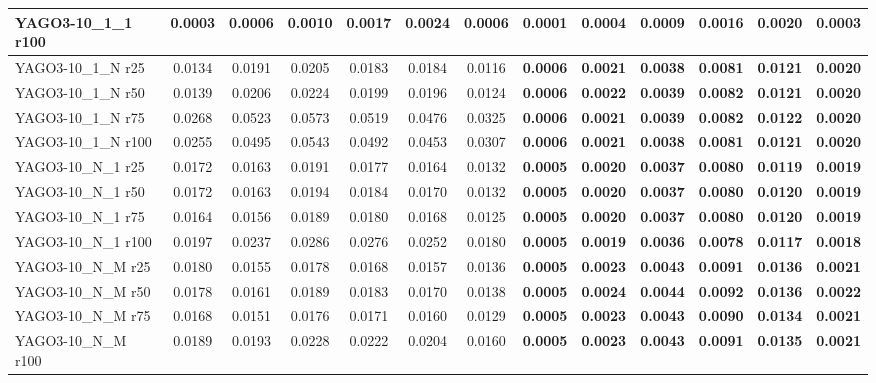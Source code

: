\begin{table}[t]
{\begin{tabular}{l||cccccc||cccccc}
YAGO3-10\_1\_1 r100 & 0.0003 & 0.0006 & 0.0010 & 0.0017 & 0.0024 & 0.0006 & \textbf{0.0001} & \textbf{0.0004} & \textbf{0.0009} & \textbf{0.0016} & \textbf{0.0020} & \textbf{0.0003} \\
\hline
YAGO3-10\_1\_N r25 & 0.0134 & 0.0191 & 0.0205 & 0.0183 & 0.0184 & 0.0116 & \textbf{0.0006} & \textbf{0.0021} & \textbf{0.0038} & \textbf{0.0081} & \textbf{0.0121} & \textbf{0.0020} \\
YAGO3-10\_1\_N r50 & 0.0139 & 0.0206 & 0.0224 & 0.0199 & 0.0196 & 0.0124 & \textbf{0.0006} & \textbf{0.0022} & \textbf{0.0039} & \textbf{0.0082} & \textbf{0.0121} & \textbf{0.0020} \\
YAGO3-10\_1\_N r75 & 0.0268 & 0.0523 & 0.0573 & 0.0519 & 0.0476 & 0.0325 & \textbf{0.0006} & \textbf{0.0021} & \textbf{0.0039} & \textbf{0.0082} & \textbf{0.0122} & \textbf{0.0020} \\
YAGO3-10\_1\_N r100 & 0.0255 & 0.0495 & 0.0543 & 0.0492 & 0.0453 & 0.0307 & \textbf{0.0006} & \textbf{0.0021} & \textbf{0.0038} & \textbf{0.0081} & \textbf{0.0121} & \textbf{0.0020} \\
\hline
YAGO3-10\_N\_1 r25 & 0.0172 & 0.0163 & 0.0191 & 0.0177 & 0.0164 & 0.0132 & \textbf{0.0005} & \textbf{0.0020} & \textbf{0.0037} & \textbf{0.0080} & \textbf{0.0119} & \textbf{0.0019} \\
YAGO3-10\_N\_1 r50 & 0.0172 & 0.0163 & 0.0194 & 0.0184 & 0.0170 & 0.0132 & \textbf{0.0005} & \textbf{0.0020} & \textbf{0.0037} & \textbf{0.0080} & \textbf{0.0120} & \textbf{0.0019} \\
YAGO3-10\_N\_1 r75 & 0.0164 & 0.0156 & 0.0189 & 0.0180 & 0.0168 & 0.0125 & \textbf{0.0005} & \textbf{0.0020} & \textbf{0.0037} & \textbf{0.0080} & \textbf{0.0120} & \textbf{0.0019} \\
YAGO3-10\_N\_1 r100 & 0.0197 & 0.0237 & 0.0286 & 0.0276 & 0.0252 & 0.0180 & \textbf{0.0005} & \textbf{0.0019} & \textbf{0.0036} & \textbf{0.0078} & \textbf{0.0117} & \textbf{0.0018} \\
\hline
YAGO3-10\_N\_M r25 & 0.0180 & 0.0155 & 0.0178 & 0.0168 & 0.0157 & 0.0136 & \textbf{0.0005} & \textbf{0.0023} & \textbf{0.0043} & \textbf{0.0091} & \textbf{0.0136} & \textbf{0.0021} \\
YAGO3-10\_N\_M r50 & 0.0178 & 0.0161 & 0.0189 & 0.0183 & 0.0170 & 0.0138 & \textbf{0.0005} & \textbf{0.0024} & \textbf{0.0044} & \textbf{0.0092} & \textbf{0.0136} & \textbf{0.0022} \\
YAGO3-10\_N\_M r75 & 0.0168 & 0.0151 & 0.0176 & 0.0171 & 0.0160 & 0.0129 & \textbf{0.0005} & \textbf{0.0023} & \textbf{0.0043} & \textbf{0.0090} & \textbf{0.0134} & \textbf{0.0021} \\
YAGO3-10\_N\_M r100 & 0.0189 & 0.0193 & 0.0228 & 0.0222 & 0.0204 & 0.0160 & \textbf{0.0005} & \textbf{0.0023} & \textbf{0.0043} & \textbf{0.0091} & \textbf{0.0135} & \textbf{0.0021} \\
\hline
\end{tabular}%
}
\end{table}
